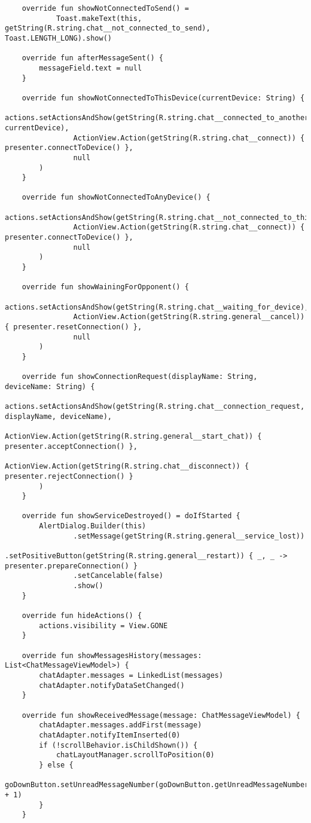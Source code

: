 \begin{lstlisting}
    override fun showNotConnectedToSend() =
            Toast.makeText(this, getString(R.string.chat__not_connected_to_send), Toast.LENGTH_LONG).show()

    override fun afterMessageSent() {
        messageField.text = null
    }

    override fun showNotConnectedToThisDevice(currentDevice: String) {
        actions.setActionsAndShow(getString(R.string.chat__connected_to_another, currentDevice),
                ActionView.Action(getString(R.string.chat__connect)) { presenter.connectToDevice() },
                null
        )
    }

    override fun showNotConnectedToAnyDevice() {
        actions.setActionsAndShow(getString(R.string.chat__not_connected_to_this_device),
                ActionView.Action(getString(R.string.chat__connect)) { presenter.connectToDevice() },
                null
        )
    }

    override fun showWainingForOpponent() {
        actions.setActionsAndShow(getString(R.string.chat__waiting_for_device),
                ActionView.Action(getString(R.string.general__cancel)) { presenter.resetConnection() },
                null
        )
    }

    override fun showConnectionRequest(displayName: String, deviceName: String) {
        actions.setActionsAndShow(getString(R.string.chat__connection_request, displayName, deviceName),
                ActionView.Action(getString(R.string.general__start_chat)) { presenter.acceptConnection() },
                ActionView.Action(getString(R.string.chat__disconnect)) { presenter.rejectConnection() }
        )
    }

    override fun showServiceDestroyed() = doIfStarted {
        AlertDialog.Builder(this)
                .setMessage(getString(R.string.general__service_lost))
                .setPositiveButton(getString(R.string.general__restart)) { _, _ -> presenter.prepareConnection() }
                .setCancelable(false)
                .show()
    }

    override fun hideActions() {
        actions.visibility = View.GONE
    }

    override fun showMessagesHistory(messages: List<ChatMessageViewModel>) {
        chatAdapter.messages = LinkedList(messages)
        chatAdapter.notifyDataSetChanged()
    }

    override fun showReceivedMessage(message: ChatMessageViewModel) {
        chatAdapter.messages.addFirst(message)
        chatAdapter.notifyItemInserted(0)
        if (!scrollBehavior.isChildShown()) {
            chatLayoutManager.scrollToPosition(0)
        } else {
            goDownButton.setUnreadMessageNumber(goDownButton.getUnreadMessageNumber() + 1)
        }
    }


\end{lstlisting}
